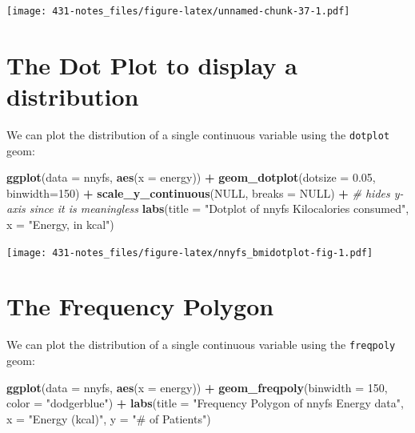 \documentclass[
]{book}
\newenvironment{Shaded}{\begin{snugshade}}{\end{snugshade}}
\newcommand{\CommentTok}[1]{\textcolor[rgb]{0.56,0.35,0.01}{\textit{#1}}}
\newcommand{\DataTypeTok}[1]{\textcolor[rgb]{0.13,0.29,0.53}{#1}}
\newcommand{\DecValTok}[1]{\textcolor[rgb]{0.00,0.00,0.81}{#1}}
\newcommand{\FloatTok}[1]{\textcolor[rgb]{0.00,0.00,0.81}{#1}}
\newcommand{\KeywordTok}[1]{\textcolor[rgb]{0.13,0.29,0.53}{\textbf{#1}}}
\newcommand{\NormalTok}[1]{#1}
\newcommand{\OperatorTok}[1]{\textcolor[rgb]{0.81,0.36,0.00}{\textbf{#1}}}
\newcommand{\OtherTok}[1]{\textcolor[rgb]{0.56,0.35,0.01}{#1}}
\newcommand{\StringTok}[1]{\textcolor[rgb]{0.31,0.60,0.02}{#1}}
\begin{document}
\texttt{[image: 431-notes\_files/figure-latex/unnamed-chunk-37-1.pdf]}

\hypertarget{the-dot-plot-to-display-a-distribution}{%
\section{The Dot Plot to display a distribution}\label{the-dot-plot-to-display-a-distribution}}

We can plot the distribution of a single continuous variable using the \texttt{dotplot} geom:

\begin{Shaded}
\begin{Highlighting}[]
\KeywordTok{ggplot}\NormalTok{(}\DataTypeTok{data =}\NormalTok{ nnyfs, }\KeywordTok{aes}\NormalTok{(}\DataTypeTok{x =}\NormalTok{ energy)) }\OperatorTok{+}
\StringTok{    }\KeywordTok{geom_dotplot}\NormalTok{(}\DataTypeTok{dotsize =} \FloatTok{0.05}\NormalTok{, }\DataTypeTok{binwidth=}\DecValTok{150}\NormalTok{) }\OperatorTok{+}\StringTok{ }
\StringTok{    }\KeywordTok{scale_y_continuous}\NormalTok{(}\OtherTok{NULL}\NormalTok{, }\DataTypeTok{breaks =} \OtherTok{NULL}\NormalTok{) }\OperatorTok{+}\StringTok{ }\CommentTok{# hides y-axis since it is meaningless}
\StringTok{    }\KeywordTok{labs}\NormalTok{(}\DataTypeTok{title =} \StringTok{"Dotplot of nnyfs Kilocalories consumed"}\NormalTok{,}
         \DataTypeTok{x =} \StringTok{"Energy, in kcal"}\NormalTok{)}
\end{Highlighting}
\end{Shaded}

\texttt{[image: 431-notes\_files/figure-latex/nnyfs\_bmidotplot-fig-1.pdf]}

\hypertarget{the-frequency-polygon}{%
\section{The Frequency Polygon}\label{the-frequency-polygon}}

We can plot the distribution of a single continuous variable using the \texttt{freqpoly} geom:

\begin{Shaded}
\begin{Highlighting}[]
\KeywordTok{ggplot}\NormalTok{(}\DataTypeTok{data =}\NormalTok{ nnyfs, }\KeywordTok{aes}\NormalTok{(}\DataTypeTok{x =}\NormalTok{ energy)) }\OperatorTok{+}
\StringTok{    }\KeywordTok{geom_freqpoly}\NormalTok{(}\DataTypeTok{binwidth =} \DecValTok{150}\NormalTok{, }\DataTypeTok{color =} \StringTok{"dodgerblue"}\NormalTok{) }\OperatorTok{+}\StringTok{ }
\StringTok{    }\KeywordTok{labs}\NormalTok{(}\DataTypeTok{title =} \StringTok{"Frequency Polygon of nnyfs Energy data"}\NormalTok{,}
         \DataTypeTok{x =} \StringTok{"Energy (kcal)"}\NormalTok{, }\DataTypeTok{y =} \StringTok{"# of Patients"}\NormalTok{)}
\end{Highlighting}
\end{Shaded}
\end{document}
